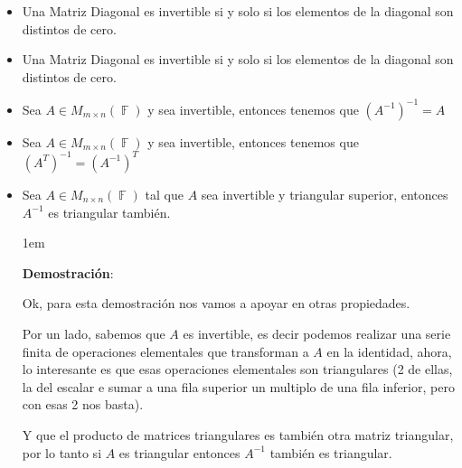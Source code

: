 \documentclass[12pt, fleqn]{report}                             %
\newenvironment{SmallIndentation}[1][0.75em]                    %
        {\begin{adjustwidth}{#1}{}\begin{footnotesize}}             %
        {\end{footnotesize}\end{adjustwidth}}                       %
\theoremstyle{break}                                            %
\DeclareMathOperator \GenericField {\mathbb{F}}                 %
\begin{document}
\begin{itemize}
\begin{SmallIndentation}[1em]
                        \end{SmallIndentation}

                    \clearpage

                    \item Una Matriz Diagonal es invertible si y solo si los elementos de la diagonal
                        son distintos de cero.

                    \item Una Matriz Diagonal es invertible si y solo si los elementos de la diagonal
                        son distintos de cero.

                    \item Sea $A \in M_{m \times n}(\GenericField)$ y sea invertible, entonces tenemos
                        que $(A^{-1})^{-1} = A$

                    \item Sea $A \in M_{m \times n}(\GenericField)$ y sea invertible, entonces tenemos
                        que $(A^T)^{-1} = (A^{-1})^T$

                    \item
                        Sea $A \in M_{n \times n}(\GenericField)$ tal que $A$ sea invertible y triangular superior, 
                        entonces $A^{-1}$ es triangular también.

                        \begin{SmallIndentation}[1em]
                            \textbf{Demostración}:
                            
                            Ok, para esta demostración nos vamos a apoyar en otras propiedades.

                            Por un lado, sabemos que $A$ es invertible, es decir podemos realizar una serie finita de operaciones
                            elementales que transforman a $A$ en la identidad, ahora, lo interesante es que esas operaciones elementales
                            son triangulares (2 de ellas, la del escalar e sumar a una fila superior un multiplo de una fila inferior,
                            pero con esas 2 nos basta).

                            Y que el producto de matrices triangulares es también otra matriz triangular, por lo tanto si $A$ es triangular
                            entonces $A^{-1}$ también es triangular.
                        
                        \end{SmallIndentation}
                            

                \end{itemize}
            
\end{document}

